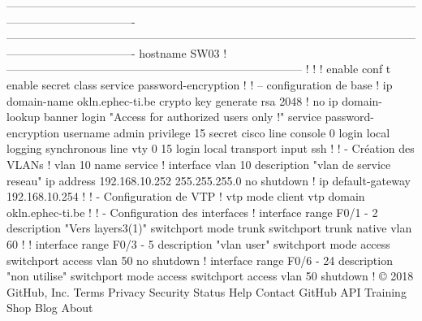 \documentclass{article}
\begin{document}
\begin{verbatimtab}[4]
----------------------------------------------------------------------------------------------------------------------------------------------
----------------------------------------------------------------------------------------------------------------------------------------------
hostname SW03
! ------------------------------------------------------------------------------
!
!
!
enable
conf t
enable secret class 
service password-encryption
!
! – configuration de base 
!
ip domain-name okln.ephec-ti.be
crypto key generate rsa
2048
!
no ip domain-lookup
banner login "Access for authorized users only !"
service password-encryption
username admin privilege 15 secret cisco
line console 0
  login local
  logging synchronous
line vty 0 15
  login local 
  transport input ssh
!
! - Création des VLANs
!
vlan 10
  name service
!
interface vlan 10
  description "vlan de service reseau"
  ip address 192.168.10.252 255.255.255.0
  no shutdown
!
ip default-gateway 192.168.10.254
!
! - Configuration de VTP
!
vtp mode client
vtp domain okln.ephec-ti.be
!
! - Configuration des interfaces
!       
interface range F0/1 - 2
  description "Vers layers3(1)"
  switchport mode trunk
  switchport trunk native vlan 60
! 
!
interface range F0/3 - 5
  description "vlan user"
  switchport mode access
  switchport access vlan 50
   no shutdown
!
interface range F0/6 - 24
  description "non utilise"
  switchport mode access
  switchport access vlan 50
  shutdown
!
© 2018 GitHub, Inc.
Terms
Privacy
Security
Status
Help
Contact GitHub
API
Training
Shop
Blog
About
\end{verbatimtab}
        
   
\end{document}
